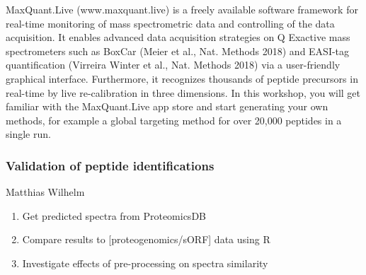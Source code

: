 MaxQuant.Live (www.maxquant.live) is a freely available software framework for
real-time monitoring of mass spectrometric data and controlling of the data
acquisition. It enables advanced data acquisition strategies on Q Exactive mass
spectrometers such as BoxCar (Meier et al., Nat. Methods 2018) and EASI-tag
quantification (Virreira Winter et al., Nat. Methods 2018) via a user-friendly
graphical interface. Furthermore, it recognizes thousands of peptide precursors
in real-time by live re-calibration in three dimensions. In this workshop, you
will get familiar with the MaxQuant.Live app store and start generating your
own methods, for example a global targeting method for over 20,000 peptides in
a single run.

\subsubsection*{\color{eubicRed} Validation of peptide identifications}
{\color{eubicGray}Matthias Wilhelm}

\begin{enumerate}
  \item Get predicted spectra from ProteomicsDB
  \item Compare results to [proteogenomics/sORF] data using R
  \item Investigate effects of pre-processing on spectra similarity
\end{enumerate}
